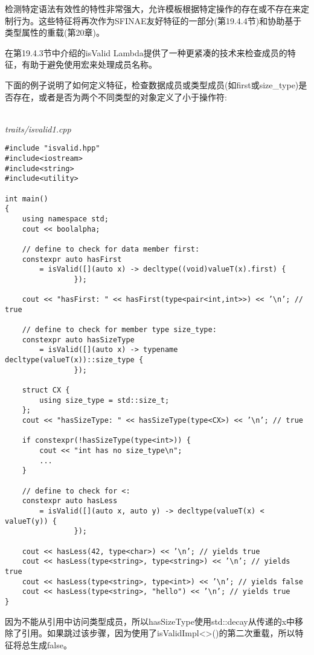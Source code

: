 检测特定语法有效性的特性非常强大，允许模板根据特定操作的存在或不存在来定制行为。这些特征将再次作为SFINAE友好特征的一部分(第19.4.4节)和协助基于类型属性的重载(第20章)。


在第19.4.3节中介绍的isValid Lambda提供了一种更紧凑的技术来检查成员的特征，有助于避免使用宏来处理成员名称。

下面的例子说明了如何定义特征，检查数据成员或类型成员(如first或size\_type)是否存在，或者是否为两个不同类型的对象定义了小于操作符:

\hspace*{\fill} \\ %
\noindent
\textit{traits/isvalid1.cpp}
\begin{lstlisting}[style=styleCXX]
#include "isvalid.hpp"
#include<iostream>
#include<string>
#include<utility>

int main()
{
	using namespace std;
	cout << boolalpha;
	
	// define to check for data member first:
	constexpr auto hasFirst
		= isValid([](auto x) -> decltype((void)valueT(x).first) {
				});

	cout << "hasFirst: " << hasFirst(type<pair<int,int>>) << ’\n’; // true
	
	// define to check for member type size_type:
	constexpr auto hasSizeType
		= isValid([](auto x) -> typename decltype(valueT(x))::size_type {
				});
			
	struct CX {
		using size_type = std::size_t;
	};
	cout << "hasSizeType: " << hasSizeType(type<CX>) << ’\n’; // true
	
	if constexpr(!hasSizeType(type<int>)) {
		cout << "int has no size_type\n";
		...
	}

	// define to check for <:
	constexpr auto hasLess
		= isValid([](auto x, auto y) -> decltype(valueT(x) < valueT(y)) {
				});
			
	cout << hasLess(42, type<char>) << ’\n’; // yields true
	cout << hasLess(type<string>, type<string>) << ’\n’; // yields true
	cout << hasLess(type<string>, type<int>) << ’\n’; // yields false
	cout << hasLess(type<string>, "hello") << ’\n’; // yields true
}
\end{lstlisting}

因为不能从引用中访问类型成员，所以hasSizeType使用std::decay从传递的x中移除了引用。如果跳过该步骤，因为使用了isValidImpl<>()的第二次重载，所以特征将总生成false。

